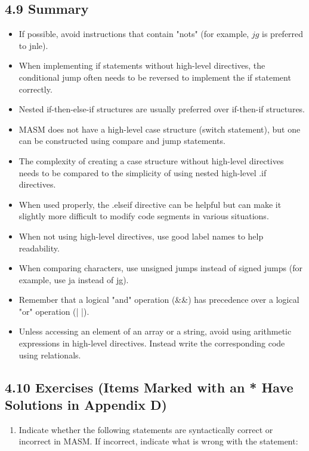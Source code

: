 \documentclass[10pt]{article}
\begin{document}
\subsection*{4.9 Summary}
\begin{itemize}
  \item If possible, avoid instructions that contain "nots" (for example, $j g$ is preferred to jnle).
  \item When implementing if statements without high-level directives, the conditional jump often needs to be reversed to implement the if statement correctly.
  \item Nested if-then-else-if structures are usually preferred over if-then-if structures.
  \item MASM does not have a high-level case structure (switch statement), but one can be constructed using compare and jump statements.
  \item The complexity of creating a case structure without high-level directives needs to be compared to the simplicity of using nested high-level .if directives.
  \item When used properly, the .elseif directive can be helpful but can make it slightly more difficult to modify code segments in various situations.
  \item When not using high-level directives, use good label names to help readability.
  \item When comparing characters, use unsigned jumps instead of signed jumps (for example, use ja instead of jg).
  \item Remember that a logical "and" operation (\&\&) has precedence over a logical "or" operation (| |).
  \item Unless accessing an element of an array or a string, avoid using arithmetic expressions in high-level directives. Instead write the corresponding code using relationals.
\end{itemize}

\subsection*{4.10 Exercises (Items Marked with an * Have Solutions in Appendix D)}
\begin{enumerate}
  \item Indicate whether the following statements are syntactically correct or incorrect in MASM. If incorrect, indicate what is wrong with the statement:
\end{enumerate}
\end{document}
